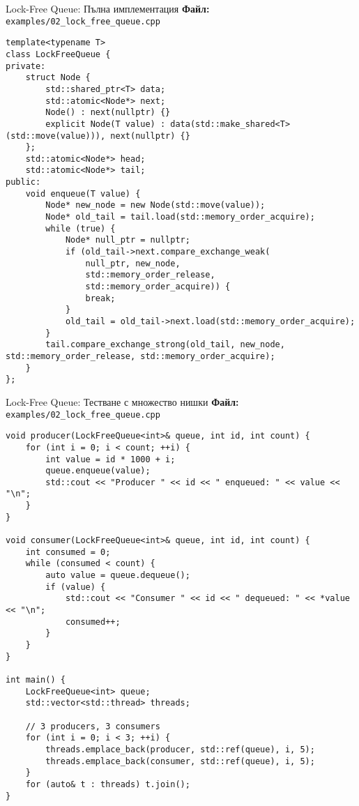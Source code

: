 \documentclass[aspectratio=169]{beamer}
\begin{document}
\begin{frame}[fragile]{Lock-Free Queue: Пълна имплементация}
\textbf{Файл:} \texttt{examples/02\_lock\_free\_queue.cpp}
\begin{lstlisting}[basicstyle=\ttfamily\tiny]
template<typename T>
class LockFreeQueue {
private:
    struct Node {
        std::shared_ptr<T> data;
        std::atomic<Node*> next;
        Node() : next(nullptr) {}
        explicit Node(T value) : data(std::make_shared<T>(std::move(value))), next(nullptr) {}
    };
    std::atomic<Node*> head;
    std::atomic<Node*> tail;
public:
    void enqueue(T value) {
        Node* new_node = new Node(std::move(value));
        Node* old_tail = tail.load(std::memory_order_acquire);
        while (true) {
            Node* null_ptr = nullptr;
            if (old_tail->next.compare_exchange_weak(
                null_ptr, new_node,
                std::memory_order_release,
                std::memory_order_acquire)) {
                break;
            }
            old_tail = old_tail->next.load(std::memory_order_acquire);
        }
        tail.compare_exchange_strong(old_tail, new_node, std::memory_order_release, std::memory_order_acquire);
    }
};
\end{lstlisting}
\end{frame}

\begin{frame}[fragile]{Lock-Free Queue: Тестване с множество нишки}
\textbf{Файл:} \texttt{examples/02\_lock\_free\_queue.cpp}
\begin{lstlisting}[basicstyle=\ttfamily\tiny]
void producer(LockFreeQueue<int>& queue, int id, int count) {
    for (int i = 0; i < count; ++i) {
        int value = id * 1000 + i;
        queue.enqueue(value);
        std::cout << "Producer " << id << " enqueued: " << value << "\n";
    }
}

void consumer(LockFreeQueue<int>& queue, int id, int count) {
    int consumed = 0;
    while (consumed < count) {
        auto value = queue.dequeue();
        if (value) {
            std::cout << "Consumer " << id << " dequeued: " << *value << "\n";
            consumed++;
        }
    }
}

int main() {
    LockFreeQueue<int> queue;
    std::vector<std::thread> threads;
    
    // 3 producers, 3 consumers
    for (int i = 0; i < 3; ++i) {
        threads.emplace_back(producer, std::ref(queue), i, 5);
        threads.emplace_back(consumer, std::ref(queue), i, 5);
    }
    for (auto& t : threads) t.join();
}
\end{lstlisting}
\end{frame}
\end{document}
